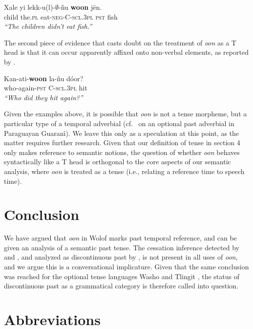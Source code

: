 \documentclass[output=paper]{langsci/langsci}
\begin{document}
\ea
\gll Xale yi lekk-{u(l)}-$\emptyset$-\~nu \textbf{woon} j\"en.\\
child the.\textsc{pl} eat-\textsc{neg-C-scl.3pl} \textsc{pst} fish\\
\glt \textit{``The children didn't eat fish.''}\label{ex:bochnak:neg}
\z


The second piece of evidence that casts doubt on the treatment of 
\textit{oon} as a T head is that it can occur apparently affixed onto
non-verbal elements, as reported by \cite{torrence12clause}. 

\ea
\gll Kan-ati-\textbf{woon} la-\~nu d\'oor?\\
who-again-\textsc{pst} C-\textsc{scl.3pl} hit\\
\glt \textit{``Who did they hit again?''}\hfill\citep[p.24]{torrence12clause}
\z

Given the examples above, it is possible that \textit{oon} is not a
tense morpheme, but a particular type of a temporal adverbial (cf.~\citealt{tonhauser06temporal} on an optional past adverbial in Paraguayan Guaran\'\i). We
leave this only as a speculation at this point, as the matter requires
further research. Given that our definition of tense in section 4 only makes reference to semantic notions, the question of whether \textit{oon} behaves syntactically like a T head is orthogonal to the core aspects of our semantic analysis, where \textit{oon} is treated as a tense (i.e., relating a reference time to speech time).


\section{Conclusion}

We have argued that \textit{oon} in Wolof marks past temporal reference, and can be given an analysis of a semantic past tense. The cessation inference detected by \citet{church81systeme} and
\citet{robert91approche}, and analyzed as discontinuous past by
\citet{Plungian2006}, is not present in all uses of \textit{oon},
and we argue this is a conversational implicature. Given that the same conclusion was reached for the optional tense languages Washo \citep{bochnak16past} and Tlingit \citep{cable16implicatures}, the status of discontinuous past as a grammatical category is therefore called into question. 


\section*{Abbreviations}
\end{document}
